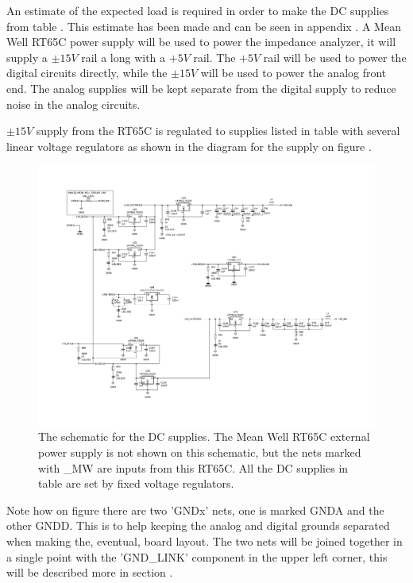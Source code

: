 An estimate of the expected load is required in order to make the DC supplies from table . This estimate has been made and can be seen in appendix . A Mean Well RT65C\cite{RT65C} power supply will be used to power the impedance analyzer, it will supply a $\pm 15V$ rail a long with a $+5V$ rail. The $+5V$ rail will be used to power the digital circuits directly, while the $\pm 15V$ will be used to power the analog front end. The analog supplies will be kept separate from the digital supply to reduce noise in the analog circuits.

$\pm 15V$ supply from the RT65C is regulated to supplies listed in table  with several linear voltage regulators as shown in the diagram for the supply on figure .

\begin{figure}[H]
    \centering
    \includegraphics[clip, trim=0 50 0 0, width=1\textwidth]{Appendix/Figures/A_SCH_DCSUPPLY.pdf}
    \caption{The schematic for the DC supplies. The Mean Well RT65C external power supply is not shown on this schematic, but the nets marked with \_MW are inputs from this RT65C. All the DC supplies in table  are set by fixed voltage regulators.}
    \label{fig_7_1_6_DCSUPPLY}
\end{figure}

Note how on figure  there are two 'GNDx' nets, one is marked GNDA and the other GNDD. This is to help keeping the analog and digital grounds separated when making the, eventual, board layout. The two nets will be joined together in a single point with the 'GND\_LINK' component in the upper left corner, this will be described more in section .

